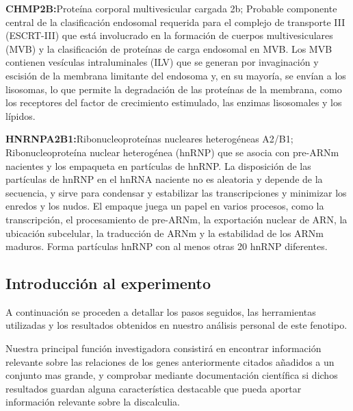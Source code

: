 \hfill

\textbf{CHMP2B\cite{CHMP2B}:}Proteína corporal multivesicular cargada 2b; Probable componente central de la clasificación endosomal requerida para el complejo de transporte III (ESCRT-III) que está involucrado en la formación de cuerpos multivesiculares (MVB) y la clasificación de proteínas de carga endosomal en MVB. Los MVB contienen vesículas intraluminales (ILV) que se generan por invaginación y escisión de la membrana limitante del endosoma y, en su mayoría, se envían a los lisosomas, lo que permite la degradación de las proteínas de la membrana, como los receptores del factor de crecimiento estimulado, las enzimas lisosomales y los lípidos.

\hfill

\textbf{HNRNPA2B1\cite{HNRNPA2B1}:}Ribonucleoproteínas nucleares heterogéneas A2/B1; Ribonucleoproteína nuclear heterogénea (hnRNP) que se asocia con pre-ARNm nacientes y los empaqueta en partículas de hnRNP. La disposición de las partículas de hnRNP en el hnRNA naciente no es aleatoria y depende de la secuencia, y sirve para condensar y estabilizar las transcripciones y minimizar los enredos y los nudos. El empaque juega un papel en varios procesos, como la transcripción, el procesamiento de pre-ARNm, la exportación nuclear de ARN, la ubicación subcelular, la traducción de ARNm y la estabilidad de los ARNm maduros. Forma partículas hnRNP con al menos otras 20 hnRNP diferentes.


\subsection{Introducción al experimento}

A continuación se proceden a detallar los pasos seguidos, las herramientas utilizadas y los resultados obtenidos en nuestro análisis personal de este fenotipo.

\hfill

Nuestra principal función investigadora consistirá en encontrar información relevante sobre las relaciones de los genes anteriormente citados añadidos a un conjunto mas grande, y comprobar mediante documentación científica si dichos resultados guardan alguna característica destacable que pueda aportar información relevante sobre la discalculia.

\newpage